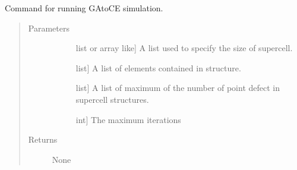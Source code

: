 \documentclass[letterpaper,10pt,english]{sphinxmanual}
\begin{document}
\begin{fulllineitems}
\label{\detokenize{pygace.scripts:pygace.scripts.rungace.rungace}}
\sphinxAtStartPar
Command for running GA\sphinxhyphen{}to\sphinxhyphen{}CE simulation.
\begin{quote}\begin{description}
\item[{Parameters}] \leavevmode\begin{description}
\item[{}] \leavevmode{[}list or array like{]}
\sphinxAtStartPar
A list used to specify the size of supercell.

\item[{}] \leavevmode{[}list{]}
\sphinxAtStartPar
A list of elements contained in structure.

\item[{}] \leavevmode{[}list{]}
\sphinxAtStartPar
A list of maximum of the number of point defect in supercell structures.

\item[{}] \leavevmode{[}int{]}
\sphinxAtStartPar
The maximum iterations

\end{description}

\item[{Returns}] \leavevmode\begin{description}
\item[{None}] \leavevmode
\end{description}

\end{description}\end{quote}

\end{fulllineitems}

\end{document}
